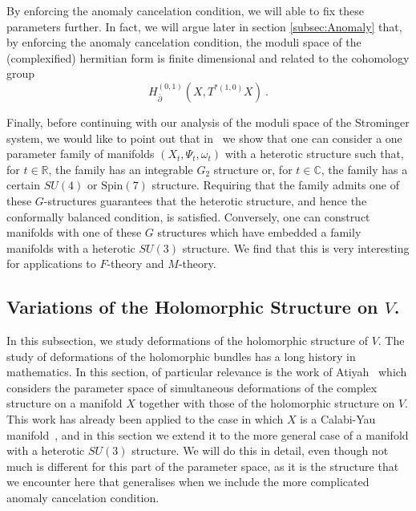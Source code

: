 \documentclass[12pt,a4paper]{article}
\newcommand{\IC}{\mathbb{C}}
\newcommand{\IR}{\mathbb{R}}
\def\bar#1{\overline{#1}}
\def\bp{\bar{\partial}}
\theoremstyle{definition}
\begin{document}
By enforcing the anomaly cancelation condition, we will able to fix these parameters further. 
In fact, we will argue later in section \ref{subsec:Anomaly} that, by enforcing the anomaly cancelation condition, the moduli space of the (complexified) hermitian form is finite dimensional and related to the cohomology group
 \begin{equation*}
 H^{(0,1)}_{\bp}(X,T^{*(1,0)}X)\:.
\end{equation*} 

Finally, before continuing with our analysis of the moduli space of the Strominger system,  
we would like to point out that in~\citep{DKS2014} we show that one can consider a one parameter family of manifolds $(X_t, \Psi_t, \omega_t)$ with a heterotic structure such that, for $t\in \IR$, the family has an integrable $G_2$ structure or, for $t\in \IC$, the family has a certain $SU(4)$ or $\text{Spin}(7)$ structure.  Requiring that the family admits one of these $G$-structures guarantees that the heterotic structure, and hence the conformally balanced condition, is satisfied. Conversely, one can construct manifolds with one of these $G$ structures which have embedded a family manifolds with a heterotic $SU(3)$ structure.  We find that this is very interesting for applications to $F$-theory and $M$-theory.   

\subsection{Variations of the Holomorphic Structure on \texorpdfstring{$V$}\ .}
\label{subsec:defsV}

In this subsection, we study deformations  of the holomorphic structure of $V$.  The study of deformations of the holomorphic bundles has a long history in mathematics.  In this section, of particular relevance is  the work of Atiyah~\citep{MR0086359} which considers the parameter space of simultaneous deformations of the complex structure on a manifold $X$ together with those of the holomorphic structure on $V$.  This work has already been applied to the case in which $X$ is a Calabi-Yau manifold~\citep{Anderson:2010mh, Anderson:2011ty}, and in this section we extend it to the more general case of a manifold with a heterotic $SU(3)$ structure. We will do this in detail, even though not much is different for this part of the parameter space, as it is the structure that we encounter here that generalises when we include the more complicated anomaly cancelation condition.
\end{document}
